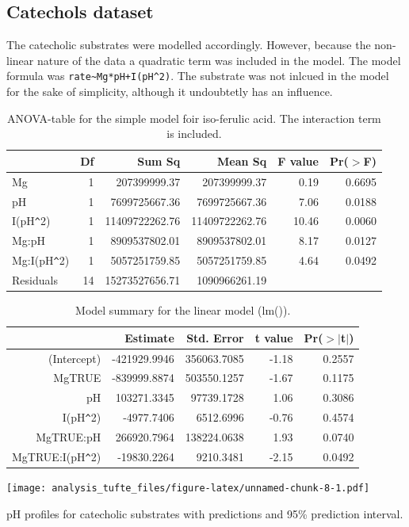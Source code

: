 \documentclass[]{tufte-handout}
\begin{document}
\subsection{Catechols dataset}\label{catechols-dataset}

The catecholic substrates were modelled accordingly. However, because
the non-linear nature of the data a quadratic term was included in the
model. The model formula was
\texttt{rate\textasciitilde{}Mg*pH+I(pH\^{}2)}. The substrate was not
inlcued in the model for the sake of simplicity, although it undoubtetly
has an influence.

\begin{table}[ht]
\centering
\begin{tabular}{lrrrrr}
  \toprule
 & Df & Sum Sq & Mean Sq & F value & Pr($>$F) \\ 
  \midrule
Mg          & 1 & 207399999.37 & 207399999.37 & 0.19 & 0.6695 \\ 
  pH          & 1 & 7699725667.36 & 7699725667.36 & 7.06 & 0.0188 \\ 
  I(pH\verb|^|2)     & 1 & 11409722262.76 & 11409722262.76 & 10.46 & 0.0060 \\ 
  Mg:pH       & 1 & 8909537802.01 & 8909537802.01 & 8.17 & 0.0127 \\ 
  Mg:I(pH\verb|^|2)  & 1 & 5057251759.85 & 5057251759.85 & 4.64 & 0.0492 \\ 
  Residuals   & 14 & 15273527656.71 & 1090966261.19 &  &  \\ 
   \bottomrule
\end{tabular}
\caption{ANOVA-table for the simple model foir iso-ferulic acid. The interaction term is included.} 
\end{table}\begin{table}[ht]
\centering
\begin{tabular}{rrrrr}
  \toprule
 & Estimate & Std. Error & t value & Pr($>$$|$t$|$) \\ 
  \midrule
(Intercept) & -421929.9946 & 356063.7085 & -1.18 & 0.2557 \\ 
  MgTRUE & -839999.8874 & 503550.1257 & -1.67 & 0.1175 \\ 
  pH & 103271.3345 & 97739.1728 & 1.06 & 0.3086 \\ 
  I(pH\verb|^|2) & -4977.7406 & 6512.6996 & -0.76 & 0.4574 \\ 
  MgTRUE:pH & 266920.7964 & 138224.0638 & 1.93 & 0.0740 \\ 
  MgTRUE:I(pH\verb|^|2) & -19830.2264 & 9210.3481 & -2.15 & 0.0492 \\ 
   \bottomrule
\end{tabular}
\caption{Model summary for the linear model (lm()).} 
\end{table}\begin{marginfigure}
 \texttt{[image: analysis\_tufte\_files/figure-latex/unnamed-chunk-8-1.pdf]}
\caption{pH profiles for catecholic substrates with predictions and 95\% prediction interval.}
\end{marginfigure}
\end{document}
